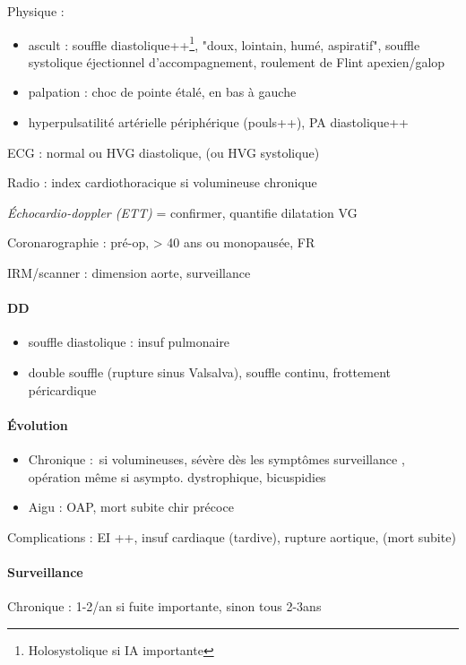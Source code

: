 \documentclass{article}
\begin{document}
Physique : 
\begin{itemize}
  \item ascult : souffle diastolique++\footnote{Holosystolique si IA importante}, "doux, lointain, humé, aspiratif",
    souffle systolique éjectionnel d'accompagnement, roulement de Flint
    apexien/galop
  \item palpation : choc de pointe étalé, en bas à gauche
  \item hyperpulsatilité artérielle périphérique (pouls++), \dec PA
    diastolique++
\end{itemize}

ECG : normal ou \gls{HVG} diastolique, (ou HVG systolique)

Radio : \inc index cardiothoracique si volumineuse chronique

\textit{Échocardio-doppler (ETT)} = confirmer, quantifie dilatation VG 

Coronarographie : pré-op, \male > 40 ans ou \female monopausée, FR

IRM/scanner : dimension aorte, surveillance

\paragraph{DD} 
\begin{itemize}
  \item souffle diastolique : insuf pulmonaire
  \item double souffle (rupture sinus Valsalva), souffle continu, frottement
    péricardique
\end{itemize}
\paragraph{Évolution}
\begin{itemize}
  \item Chronique : si volumineuses, sévère dès les symptômes \thus surveillance
\danger, opération même si asympto. \danger dystrophique, bicuspidies
  \item Aigu : OAP, mort subite \thus chir précoce
\end{itemize}

Complications : EI ++, insuf cardiaque (tardive), rupture aortique, (mort subite)
   
\paragraph{Surveillance} 
Chronique : 1-2/an si fuite importante, sinon tous 2-3ans
\end{document}
